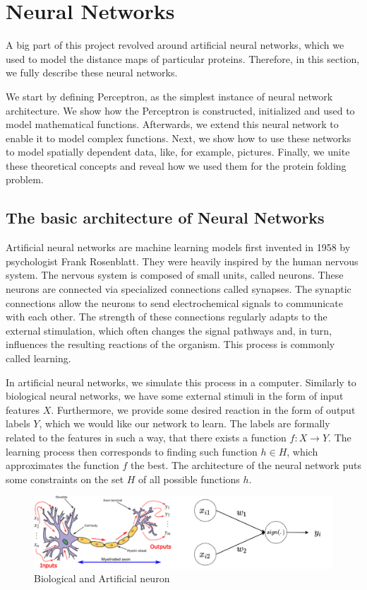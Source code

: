 \section{Neural Networks}
A big part of this project revolved around artificial neural networks, which we used to model the distance maps of particular proteins. 
Therefore, in this section, we fully describe these neural networks.

We start by defining Perceptron, as the simplest instance of neural network architecture.
We show how the Perceptron is constructed, initialized and used to model mathematical functions.
Afterwards, we extend this neural network to enable it to model complex functions.
Next, we show how to use these networks to model spatially dependent data, like, for example, pictures.
Finally, we unite these theoretical concepts and reveal how we used them for the protein folding problem.

\subsection{The basic architecture of Neural Networks}
Artificial neural networks are machine learning models first invented in 1958 by psychologist Frank Rosenblatt.
They were heavily inspired by the human nervous system.
The nervous system is composed of small units, called neurons.
These neurons are connected via specialized connections called synapses.
The synaptic connections allow the neurons to send electrochemical signals to communicate with each other.
The strength of these connections regularly adapts to the external stimulation, which often changes the signal pathways and, in turn, influences the resulting reactions of the organism.
This process is commonly called learning.

In artificial neural networks, we simulate this process in a computer.
Similarly to biological neural networks, we have some external stimuli in the form of input features $X$.
Furthermore, we provide some desired reaction in the form of output labels $Y$, which we would like our network to learn.
The labels are formally related to the features in such a way, that there exists a function $f: X \to Y$.
The learning process then corresponds to finding such function $h \in H$, which approximates the function $f$ the best.
The architecture of the neural network puts some constraints on the set $H$ of all possible functions $h$.

\begin{figure}[ht]
    \centering
    \includegraphics[width=\linewidth]{imgs_tomas/perceptron.png}
    \caption{Biological and Artificial neuron}
    \label{fig:neurons_comparison}
\end{figure}

